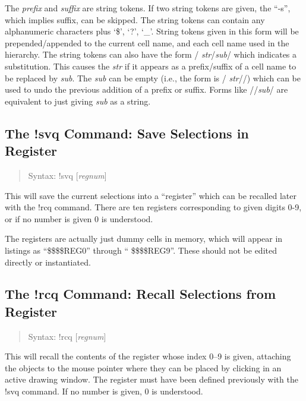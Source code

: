 The {\it prefix} and {\it suffix} are string tokens.  If two string
tokens are given, the ``{\vt -s}'', which implies suffix, can be
skipped.  The string tokens can contain any alphanumeric characters
plus `\$', `?', `\_'.  String tokens given in this form will be
prepended/appended to the current cell name, and each cell name used
in the hierarchy.  The string tokens can also have the form /{\it
str}/{\it sub}/ which indicates a substitution.  This causes the {\it
str} if it appears as a prefix/suffix of a cell name to be replaced by
{\it sub}.  The {\it sub} can be empty (i.e., the form is /{\it
str}//) which can be used to undo the previous addition of a prefix or
suffix.  Forms like //{\it sub}/ are equivalent to just giving {\it
sub} as a string.

\subsection{The {\cb !svq} Command: Save Selections in Register}
\begin{quote}
Syntax: {\vt !svq} [{\it regnum\/}]
\end{quote}
This will save the current selections into a ``register'' which can be
recalled later with the {\cb !rcq} command.  There are ten registers
corresponding to given digits 0-9, or if no number is given 0 is
understood.

The registers are actually just dummy cells in memory, which will
appear in listings as ``{\vt \$\$\$\$REG0}'' through ``{\vt
\$\$\$\$REG9}''.  These should not be edited directly or instantiated.

\subsection{The {\cb !rcq} Command: Recall Selections from Register}
\begin{quote}
Syntax: {\vt !rcq} [{\it regnum\/}]
\end{quote}
This will recall the contents of the register whose index 0--9 is
given, attaching the objects to the mouse pointer where they can be
placed by clicking in an active drawing window.  The register must
have been defined previously with the {\cb !svq} command.  If no
number is given, 0 is understood.

